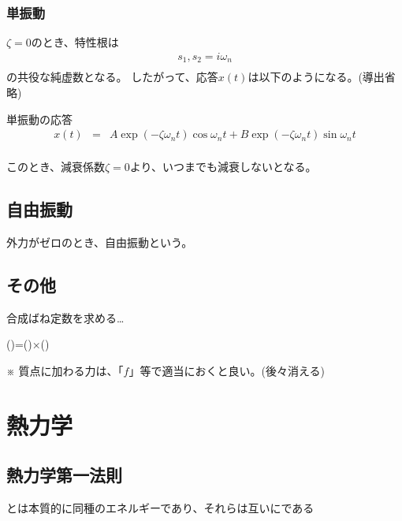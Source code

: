 \documentclass[a4paper]{jsarticle}
\begin{document}
\subsubsection{単振動}
$\zeta = 0$のとき、特性根は
\begin{eqnarray*}
    s_1,s_2=i\omega_n\\
\end{eqnarray*}
の共役な純虚数となる。
したがって、応答$x\left(t\right)$は以下のようになる。(導出省略)
\begin{itembox}[l]{単振動の応答}
    \begin{eqnarray*}
        x\left(t\right)&=&A\exp{\left(-\zeta \omega_nt\right)}\cos{\omega_nt}+B\exp{\left(-\zeta \omega_nt\right)}\sin{\omega_nt}\\
    \end{eqnarray*}
\end{itembox}
このとき、減衰係数$\zeta=0$より、いつまでも減衰しないとなる。
\subsection{自由振動}
外力がゼロのとき、自由振動という。
\subsection{}
\subsection{その他}
\begin{itembox}[l]{合成ばね定数を求める\dots}
    \begin{center}
        ()\quad=\quad()\quad×\quad()
    \end{center}
\end{itembox}
※ 質点に加わる力は、「$f$」等で適当におくと良い。(後々消える)
\newpage
\section{熱力学}
\subsection{熱力学第一法則}
\begin{center}
    とは本質的に同種のエネルギーであり、それらは互いにである
\end{center}
\end{document}
